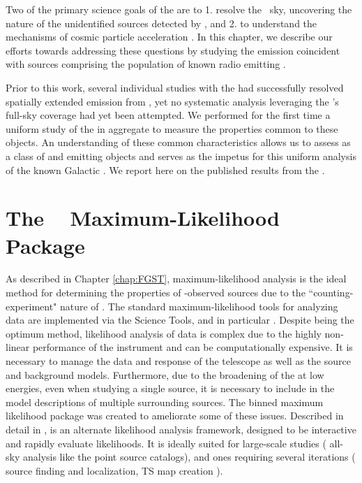 {Two of the primary science goals of the \lat{}  are to 1. resolve the \gam~sky, uncovering the nature of the unidentified sources detected by \egret{}, and 2. to understand the mechanisms of cosmic particle acceleration \citep{atwood09}. In this chapter, we describe our efforts towards addressing these questions by studying the \gam{} emission coincident with sources comprising the population of known radio emitting \snrs{}.

Prior to this work, several individual studies with the \lat{} had successfully resolved spatially extended emission from \snrs{} \citep[and references therein]{3FGL}, yet no systematic analysis leveraging the \lat{}'s full-sky coverage had yet been attempted. We performed for the first time a uniform study of the \snrs{} in aggregate to measure the properties common to these objects. An understanding of these common characteristics allows us to assess \snrs{} as a class of \gam{} and \cray{} emitting objects and serves as the impetus for this uniform analysis of the known Galactic \snrs{}. We  report here on the published results from the \snrcat{} \cite{SNRcat}. 
 

\section{\label{snrCat:ptlk}The \ptlike~  Maximum-Likelihood Package}

As described in Chapter \ref{chap:FGST}, maximum-likelihood analysis is the ideal method for determining the properties of \lat{}-observed sources due to the ``counting-experiment" nature of \FermiLat{}. The standard maximum-likelihood tools for analyzing \lat{} data are implemented via the \Fermi{} Science Tools, and in particular \gtlike{}.  Despite being the optimum method, likelihood analysis of \lat{} data is complex due to the highly non-linear performance of the instrument and can be computationally expensive. It is necessary to manage the data and response of the telescope as well as the source and background models. Furthermore, due to the broadening of the \psf{} at low energies, even when studying a single source, it is necessary to include in the model descriptions of multiple surrounding sources. The \ptlike{} binned maximum likelihood package was created to ameliorate some of these issues. Described in detail in \cite{Kerr10}, \ptlike{} is an alternate likelihood analysis framework, designed to be interactive and rapidly evaluate likelihoods. It is ideally suited for large-scale studies (\eg{} all-sky analysis like the \lat{} point source catalogs), and ones requiring several iterations (\eg{} source finding and localization, TS map creation ). 

}
